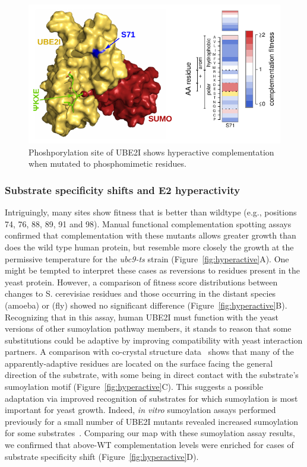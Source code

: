 \begin{figure}
	\centering
	\includegraphics[width=\textwidth]{img/phosphosite.pdf}
	\caption{Phoshporylation site of UBE2I shows hyperactive complementation when mutated to phosphomimetic residues.}
	\label{fig:phosphosite}
\end{figure}


\subsubsection{Substrate specificity shifts and E2 hyperactivity}

Intriguingly, many sites show fitness that is better than wildtype (e.g., positions 74, 76, 88, 89, 91 and 98). Manual functional complementation spotting assays confirmed that complementation with these mutants allows greater growth than does the wild type human protein, but resemble more closely the growth at the permissive temperature for the \textit{ubc9-ts} strain (Figure~\ref{fig:hyperactive}A). One might be tempted to interpret these cases as reversions to residues present in the yeast protein. However, a comparison of fitness score distributions between changes to S. cerevisiae  residues and those occurring in the distant species  (amoeba) or  (fly) showed no significant difference (Figure~\ref{fig:hyperactive}B). Recognizing that in this assay, human UBE2I must function with the yeast versions of other sumoylation pathway members, it stands to reason that some substitutions could be adaptive by improving compatibility with yeast interaction partners. A comparison with co-crystal structure data~\cite{gareau_determinants_2012} shows that many of the apparently-adaptive residues are located on the surface facing the general direction of the substrate, with some being in direct contact with the substrate's sumoylation motif (Figure~\ref{fig:hyperactive}C). This suggests a possible adaptation via improved recognition of substrates for which sumoylation is most important for yeast growth. Indeed, \textit{in vitro} sumoylation assays performed previously for a small number of UBE2I mutants revealed increased sumoylation for some substrates~\cite{bernier-villamor_structural_2002}. Comparing our map with these sumoylation assay results, we confirmed that above-WT complementation levels were enriched for cases of substrate specificity shift (Figure~\ref{fig:hyperactive}D). 



